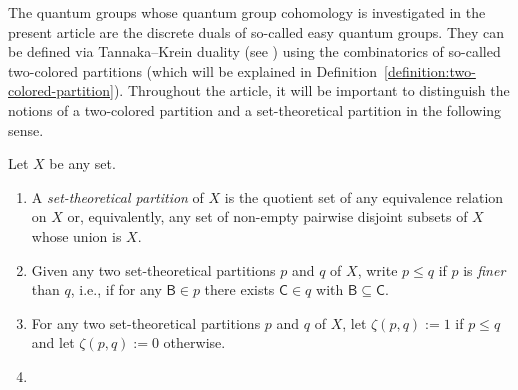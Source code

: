 \documentclass[10pt,a4paper]{amsart}
\numberwithin{equation}{section}
\newcommand{\finerthan}{\mathrel{\leq}}
\newcommand{\Yp}[1]{\mathtt{#1}}
\newcommand{\Yb}[1]{\mathsf{#1}}
\newcommand{\zetf}{\zeta}
\newcommand{\zetfx}[2]{\zetf(#1,#2)}
\begin{document}
The quantum groups whose quantum group cohomology is investigated in the present article are the discrete duals of so-called easy quantum groups. They can be defined via Tannaka--Krein duality (see \cite{Woronowicz1988}) using the combinatorics of so-called two-colored partitions (which will be explained in Definition~\ref{definition:two-colored-partition}). Throughout the article, it will be important to distinguish the notions of a two-co\-lo\-red partition and a set-theo\-re\-ti\-cal partition in the following sense.
\begin{Notation}
  \label{notation:set-theoretical-partitions}
  \newcommand{\theset}{X}
  Let $\theset$ be any set.
  \begin{enumerate}
  \item\label{notation:set-theoretical-partitions-1}
    {
      \newcommand{\thepartition}{p}
      A \emph{set-theo\-re\-ti\-cal partition} of $X$ is the quotient set of any equivalence relation on $X$ or, equivalently,  any set of non-empty pairwise disjoint subsets of $X$ whose union is $X$.
      }
  \item\label{notation:set-theoretical-partitions-2}
    {
      \newcommand{\smallpart}{p}
      \newcommand{\largepart}{q}
      \newcommand{\smallblock}{\Yb{B}}
      \newcommand{\largeblock}{\Yb{C}}
      \newcommand{\leftpartition}{p_1}
      \newcommand{\rightpartition}{p_2}
      \newcommand{\thejoin}{s}
      \newcommand{\thepartition}{p}
      \newcommand{\anyel}{\Yp{x}}
      \newcommand{\block}{\Yb{B}}
      Given any two set-theo\-re\-ti\-cal partitions $\smallpart$ and $\largepart$ of  $\theset$, write $\smallpart\finerthan\largepart$ if $\smallpart$ is \emph{finer} than $\largepart$, i.e., if for any $\smallblock\in\smallpart$ there exists $\largeblock\in\largepart$  with $\smallblock\subseteq \largeblock$.
      }
  \item\label{notation:set-theoretical-partitions-3}
    {
      \newcommand{\smallpart}{p}
      \newcommand{\largepart}{q}
      \newcommand{\smallblock}{\Yb{B}}
      \newcommand{\largeblock}{\Yb{C}}
      \newcommand{\leftpartition}{p_1}
      \newcommand{\rightpartition}{p_2}
      \newcommand{\thejoin}{s}
      \newcommand{\thepartition}{p}
      \newcommand{\anyel}{\Yp{x}}
      \newcommand{\block}{\Yb{B}}
      For any two set-theo\-re\-ti\-cal partitions $\smallpart$ and $\largepart$ of $\theset$, let $\zetfx{\smallpart}{\largepart}:= 1$ if $\smallpart\finerthan\largepart$ and  let $\zetfx{\smallpart}{\largepart}:= 0$ otherwise.
    }
  \item\label{notation:set-theoretical-partitions-4}

\end{enumerate}
\end{Notation}
\end{document}
